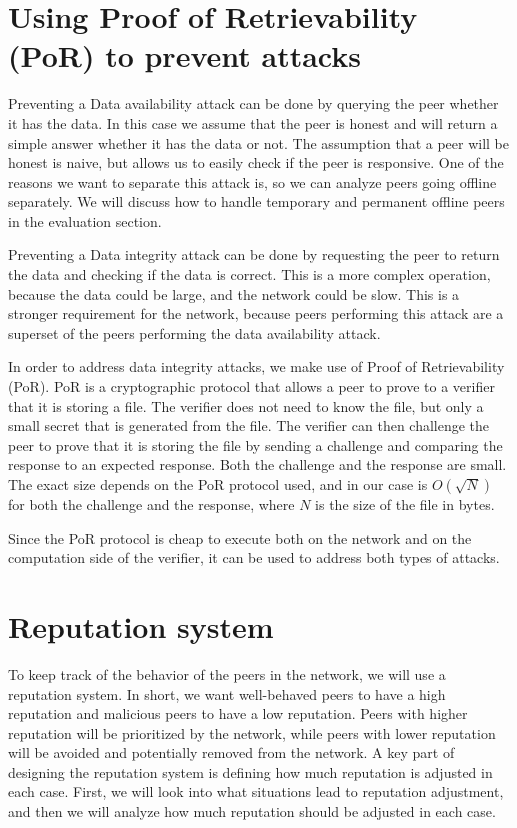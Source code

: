 \section{Using Proof of Retrievability (PoR) to prevent attacks}

Preventing a Data availability attack can be done by querying the peer whether it has the data.
In this case we assume that the peer is honest and will return a simple answer whether it has the data or not.
The assumption that a peer will be honest is naive, but allows us to easily check if the peer is responsive.
One of the reasons we want to separate this attack is, so we can analyze peers going offline separately.
We will discuss how to handle temporary and permanent offline peers in the evaluation section.

Preventing a Data integrity attack can be done by requesting the peer to return the data and checking if
the data is correct.
This is a more complex operation, because the data could be large, and the network could be slow.
This is a stronger requirement for the network, because peers performing this attack are a superset
of the peers performing the data availability attack.

In order to address data integrity attacks, we make use of Proof of Retrievability (PoR).
PoR is a cryptographic protocol that allows a peer to prove to a verifier that it is storing a file.
The verifier does not need to know the file, but only a small secret that is generated from the file.
The verifier can then challenge the peer to prove that it is storing the file by sending a challenge and
comparing the response to an expected response.
Both the challenge and the response are small.
The exact size depends on the PoR protocol used, and in our case is $O(\sqrt{N})$ \cite{poralgebra} for
both the challenge and the response, where $N$ is the size of the file in bytes.

Since the PoR protocol is cheap to execute both on the network and on the computation side of the verifier,
it can be used to address both types of attacks.

\section{Reputation system}

To keep track of the behavior of the peers in the network, we will use a reputation system.
In short, we want well-behaved peers to have a high reputation and malicious peers to have a low reputation.
Peers with higher reputation will be prioritized by the network, while peers with lower reputation will be
avoided and potentially removed from the network.
A key part of designing the reputation system is defining how much reputation is adjusted in each case.
First, we will look into what situations lead to reputation adjustment, and then we will
analyze how much reputation should be adjusted in each case.

